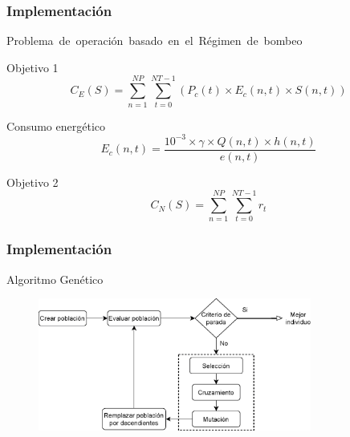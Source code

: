 \documentclass[9pt]{beamer}
\begin{document}
    \begin{frame}
        \frametitle{Implementación}                       
        Problema de operación basado en el Régimen de bombeo
        
        \begin{block}{Objetivo 1}
            \begin{equation*}
                C_E(S) = \sum_{n=1}^{NP}\sum_{t=0}^{NT-1}(P_c(t) \times E_c(n, t) \times S(n, t))
            \end{equation*}
        \end{block}

        \begin{block}{Consumo energético}
            \begin{equation*}
                E_c(n, t) = \frac{10^{-3} \times \gamma \times Q(n, t) \times h(n, t)}{e(n, t)}
            \end{equation*}
        \end{block}
        
        \begin{block}{Objetivo 2}
            \begin{equation*}
                C_N(S) = \sum_{n=1}^{NP}\sum_{t=0}^{NT-1}r_t
            \end{equation*}
        \end{block}
    \end{frame}

    \begin{frame}
        \frametitle{Implementación}                       
        Algoritmo Genético

        \begin{figure}
            \includegraphics[width=0.8\textwidth]{assets/AlgoritmoGenetico.eps}
        \end{figure}

    \end{frame}
\end{document}
